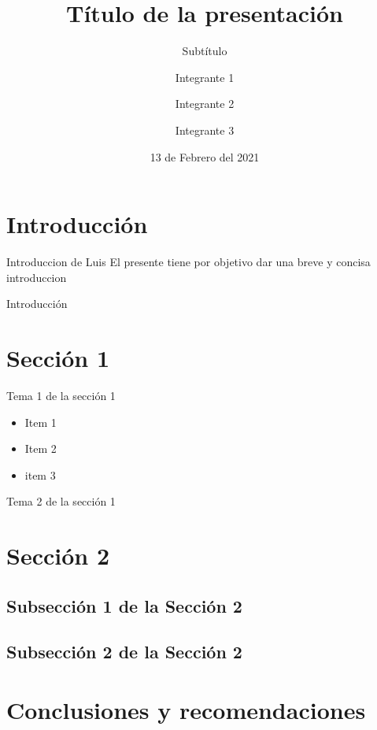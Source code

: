 \documentclass{beamer}
\title{Título de la presentación}
\subtitle{Subtítulo} %
\author{Integrante 1 \and Integrante 2 \and Integrante 3}
\institute[E.P.N]{Escuela Politécnica Nacional \par Facultad de Ingeniería en Sistemas \par Nombre de la materia}
\date{13 de Febrero del 2021} %
\begin{document}
    \frame{\titlepage}

    \frame{\tableofcontents}

    \section{Introducción}
    \begin{frame}{Introduccion de Luis}
        El presente tiene por objetivo dar una breve y concisa introduccion
    \end{frame}
    \begin{frame}{Introducción}
    \end{frame}
    \section{Sección 1}
    \begin{frame}{Tema 1 de la sección 1}
	    \begin{itemize}
            \item Item 1
            \item Item 2
            \item item 3
        \end{itemize}
    \end{frame}
    \begin{frame}{Tema 2 de la sección 1}
    \end{frame}

    \section{Sección 2}
    \subsection{Subsección 1 de la Sección 2}
    \subsection{Subsección 2 de la Sección 2}

    \section{Conclusiones y recomendaciones}
\end{document}
